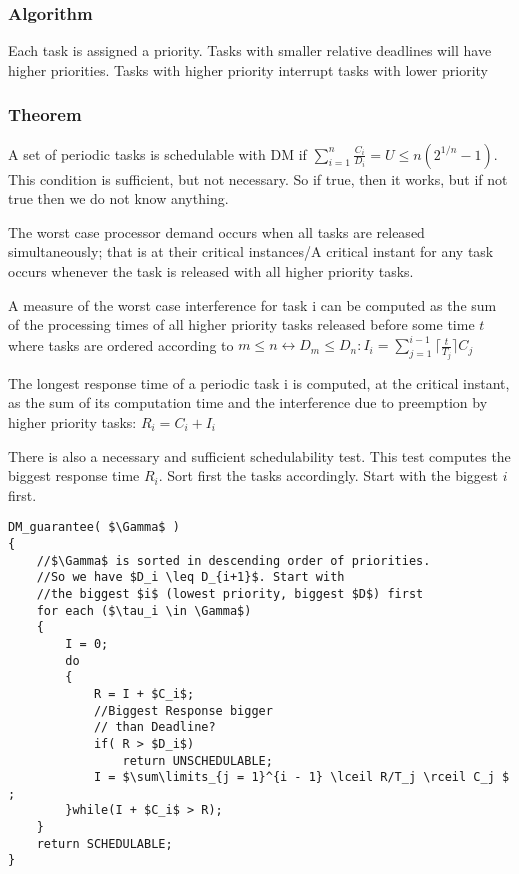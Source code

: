 \subsubsection{Algorithm}
Each task is assigned a priority. Tasks with 
smaller relative deadlines will have higher priorities. Tasks 
with higher priority interrupt tasks with lower priority

\subsubsection{Theorem}


\begin{theorem}
A set of periodic tasks is schedulable with DM if $\sum\limits_{i = 1}^{n} \frac{C_i}{D_i} = U \leq n(2^{1/n} -1)$. This condition is sufficient, but not necessary. So if true, then it works, but if not true then we do not know anything.
\end{theorem}


\begin{definition}
The worst case processor demand occurs when all tasks are released simultaneously; that is at their critical instances/A critical instant for any task occurs whenever the task is released with all higher priority tasks.
\end{definition}

\begin{theorem}
A measure of the worst case interference for task i can be computed as the sum of the processing times of all higher priority tasks released before some time $t$ where tasks are ordered according to $m \le n \leftrightarrow D_m \le D_n: I_i = \sum_{j = 1}^{i-1}  \lceil \frac{t}{T_j} \rceil C_j$
\end{theorem}


\begin{definition}
The longest response time of a periodic task i is computed, at the critical instant, as the sum of its computation time and the interference due to preemption by higher priority tasks: $R_i = C_i + I_i$
\end{definition}



\begin{theorem}
There is also a necessary and sufficient schedulability test. This test computes the biggest response time $R_i$. Sort first the tasks accordingly. Start with the biggest $i$ first.
\begin{lstlisting}[mathescape]
DM_guarantee( $\Gamma$ )
{
	//$\Gamma$ is sorted in descending order of priorities. 
	//So we have $D_i \leq D_{i+1}$. Start with
	//the biggest $i$ (lowest priority, biggest $D$) first
	for each ($\tau_i \in \Gamma$)
	{
		I = 0;
		do
		{
			R = I + $C_i$;
			//Biggest Response bigger
			// than Deadline?
			if( R > $D_i$)
				return UNSCHEDULABLE;
			I = $\sum\limits_{j = 1}^{i - 1} \lceil R/T_j \rceil C_j $ ;
		}while(I + $C_i$ > R);
	}
	return SCHEDULABLE;
}

\end{lstlisting}

\end{theorem}

